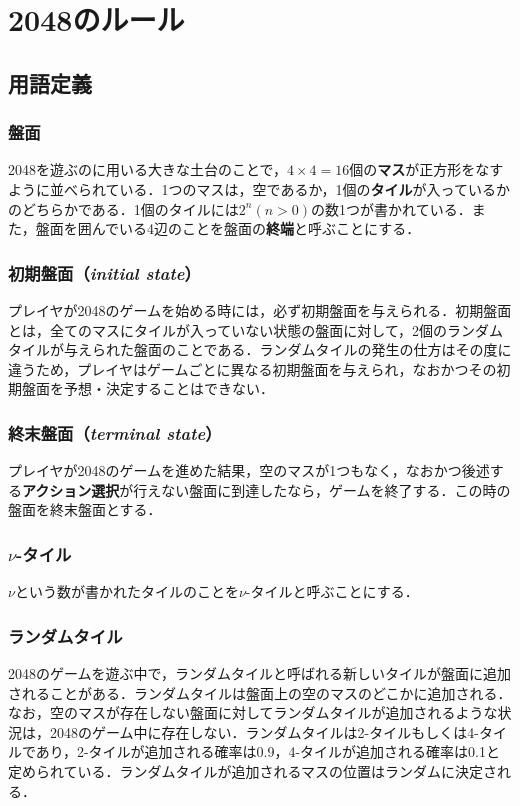 \documentclass{suribt}
\begin{document}
\section{2048のルール}
\subsection{用語定義}
\subsubsection{盤面}
2048を遊ぶのに用いる大きな土台のことで，$4 \times 4 = 16$個の\textbf{マス}が正方形をなすように並べられている．1つのマスは，空であるか，1個の\textbf{タイル}が入っているかのどちらかである．1個のタイルには$2^n (n>0)$の数1つが書かれている．また，盤面を囲んでいる4辺のことを盤面の\textbf{終端}と呼ぶことにする．

\subsubsection{初期盤面（\textit{initial state}）}
プレイヤが2048のゲームを始める時には，必ず初期盤面を与えられる．初期盤面とは，全てのマスにタイルが入っていない状態の盤面に対して，2個のランダムタイルが与えられた盤面のことである．ランダムタイルの発生の仕方はその度に違うため，プレイヤはゲームごとに異なる初期盤面を与えられ，なおかつその初期盤面を予想・決定することはできない．

\subsubsection{終末盤面（\textit{terminal state}）}
プレイヤが2048のゲームを進めた結果，空のマスが1つもなく，なおかつ後述する\textbf{アクション選択}が行えない盤面に到達したなら，ゲームを終了する．この時の盤面を終末盤面とする．

\subsubsection{${\nu}$-タイル}
${\nu}$という数が書かれたタイルのことを${\nu}$-タイルと呼ぶことにする．

\subsubsection{ランダムタイル}
2048のゲームを遊ぶ中で，ランダムタイルと呼ばれる新しいタイルが盤面に追加されることがある．ランダムタイルは盤面上の空のマスのどこかに追加される．なお，空のマスが存在しない盤面に対してランダムタイルが追加されるような状況は，2048のゲーム中に存在しない．ランダムタイルは2-タイルもしくは4-タイルであり，2-タイルが追加される確率は0.9，4-タイルが追加される確率は0.1と定められている．ランダムタイルが追加されるマスの位置はランダムに決定される．
\end{document}
